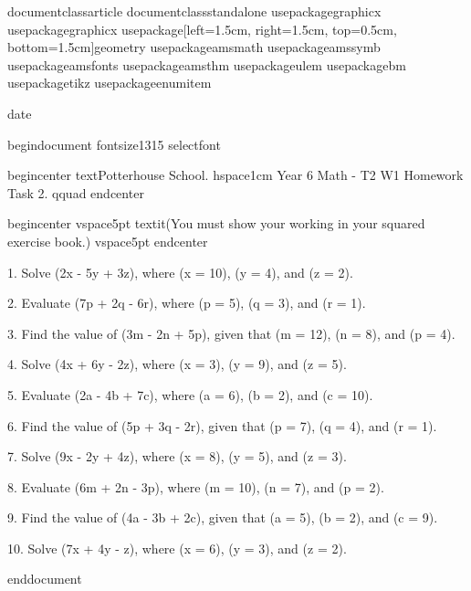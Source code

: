 documentclass{article}
documentclass{standalone}
usepackage{graphicx} %
usepackage{graphicx} %
usepackage[left=1.5cm, right=1.5cm, top=0.5cm, bottom=1.5cm]{geometry}
usepackage{amsmath}
usepackage{amssymb}
usepackage{amsfonts}
usepackage{amsthm}
usepackage{ulem}
usepackage{bm}
usepackage{tikz}
usepackage{enumitem}

date{}

begin{document}
fontsize{13}{15} selectfont %

begin{center}
 text{Potterhouse School. hspace{1cm} Year 6 Math - T2 W1 Homework Task 2.} qquad  
end{center}  

begin{center}
vspace{5pt} 
textit{(You must show your working in your squared exercise book.)  }
vspace{5pt}
end{center}

1. Solve (2x - 5y + 3z), where (x = 10), (y = 4), and (z = 2). 

2. Evaluate (7p + 2q - 6r), where (p = 5), (q = 3), and (r = 1). 

3. Find the value of (3m - 2n + 5p), given that (m = 12), (n = 8), and (p = 4). 

4. Solve (4x + 6y - 2z), where (x = 3), (y = 9), and (z = 5). 

5. Evaluate (2a - 4b + 7c), where (a = 6), (b = 2), and (c = 10). 

6. Find the value of (5p + 3q - 2r), given that (p = 7), (q = 4), and (r = 1). 

7. Solve (9x - 2y + 4z), where (x = 8), (y = 5), and (z = 3). 

8. Evaluate (6m + 2n - 3p), where (m = 10), (n = 7), and (p = 2). 

9. Find the value of (4a - 3b + 2c), given that (a = 5), (b = 2), and (c = 9). 

10. Solve (7x + 4y - z), where (x = 6), (y = 3), and (z = 2). 



end{document}
